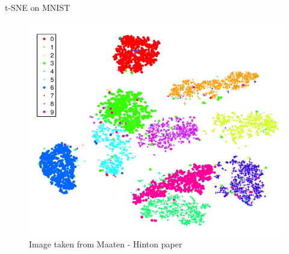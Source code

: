\documentclass[10pt]{beamer}
\theoremstyle{definition}
\newcommand{\1}{\mathbbm{1}}
\begin{document}
\begin{frame}{t-SNE on MNIST}
  \begin{figure}[h!]
    \centering
    \includegraphics[scale=0.4]{./pic/MNIST.png}
    \caption{\vspace{1px} Image taken from Maaten - Hinton paper}
  \end{figure}
\end{frame}
\end{document}
